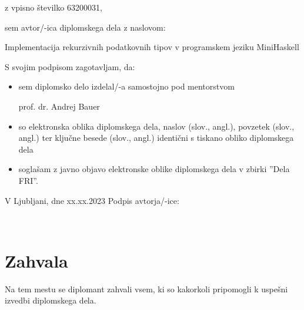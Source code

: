 \documentclass[12pt,a4paper,openany]{book}
\begin{document}
\vspace{0.5cm}
z vpisno številko \hspace{0.5cm} 63200031,

\vspace{1cm}
sem avtor/-ica diplomskega dela z naslovom:
   
\vspace{0.5cm}
Implementacija rekurzivnih podatkovnih tipov v programskem jeziku MiniHaskell

\vspace{1.5cm}
S svojim podpisom zagotavljam, da:
\begin{itemize}
	\item sem diplomsko delo izdelal/-a samostojno pod mentorstvom 
	
	prof. dr. Andrej Bauer
	
	\item	so elektronska oblika diplomskega dela, naslov (slov., angl.), povzetek (slov., angl.) ter ključne besede (slov., 			angl.) identični s tiskano obliko diplomskega dela
	\item soglašam z javno objavo elektronske oblike diplomskega dela v zbirki ''Dela FRI''.
\end{itemize}

\vspace{1cm}
V Ljubljani, dne xx.xx.2023 \hspace{1cm} Podpis avtorja/-ice:

\newpage 


\ \thispagestyle{empty}

\newpage



\chapter*{Zahvala}

\thispagestyle{empty}

Na tem mestu se diplomant zahvali vsem, ki so kakorkoli pripomogli k uspešni izvedbi diplomskega dela.


\newpage


\ \thispagestyle{empty}
\end{document}
